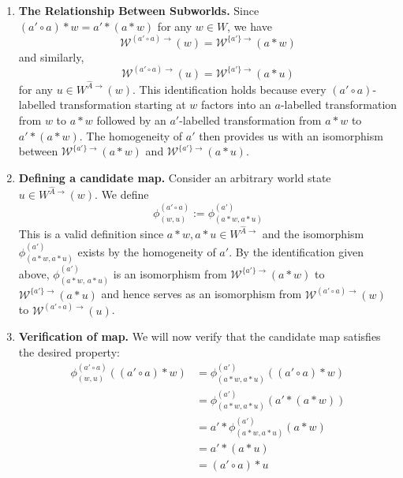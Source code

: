 \begin{proofE}
\begin{enumerate}[(1)]
    \item \textbf{The Relationship Between Subworlds.}
    Since $(a' \circ a) \ast w = a' \ast (a \ast w)$ for any $w \in W$, we have
    \begin{equation}
        \mathscr{W}^{(a' \circ a)\to}(w) = \mathscr{W}^{\{a'\}\to}(a \ast w)
    \end{equation}
    and similarly,
    \begin{equation}
        \mathscr{W}^{(a' \circ a)\to}(u) = \mathscr{W}^{\{a'\}\to}(a \ast u)
    \end{equation}
    for any $u \in W^{\hat{A}\to}(w)$.
    This identification holds because every $(a' \circ a)$-labelled transformation starting at $w$ factors into an $a$-labelled transformation from $w$ to $a \ast w$ followed by an $a'$-labelled transformation from $a \ast w$ to $a' \ast (a \ast w)$.
    The homogeneity of $a'$ then provides us with an isomorphism between $\mathscr{W}^{\{a'\}\to}(a \ast w)$ and $\mathscr{W}^{\{a'\}\to}(a \ast u)$.

    \item \textbf{Defining a candidate map.}
    Consider an arbitrary world state $u \in W^{\hat{A}\to}(w)$.
    We define
    \begin{equation}
        \phi^{(a' \circ a)}_{(w,u)} := \phi^{(a')}_{(a \ast w, a \ast u)}
    \end{equation}
    This is a valid definition since $a \ast w, a \ast u \in W^{\hat{A}\to}$ and the isomorphism $\phi^{(a')}_{(a \ast w, a \ast u)}$ exists by the homogeneity of $a'$.
    By the identification given above, $\phi^{(a')}_{(a \ast w,\, a \ast u)}$ is an isomorphism from $\mathscr{W}^{\{a'\}\to}(a \ast w)$ to $\mathscr{W}^{\{a'\}\to}(a \ast u)$ and hence serves as an isomorphism from $\mathscr{W}^{(a' \circ a)\to}(w)$ to $\mathscr{W}^{(a' \circ a)\to}(u)$.

    \item \textbf{Verification of map.}
    We will now verify that the candidate map satisfies the desired property:
    \begin{align}
        \phi^{(a' \circ a)}_{(w,u)}((a' \circ a) \ast w) & = \phi_{(a \ast w, a \ast u)}^{(a')}((a' \circ a) \ast w) \\
        & = \phi_{(a \ast w, a \ast u)}^{(a')}(a' \ast (a \ast w)) \\
        & = a' \ast \phi_{(a \ast w, a \ast u)}^{(a')}(a \ast w) \\
        & = a' \ast (a \ast u) \\
        & = (a' \circ a) \ast u
    \end{align}
\end{enumerate}
\end{proofE}


